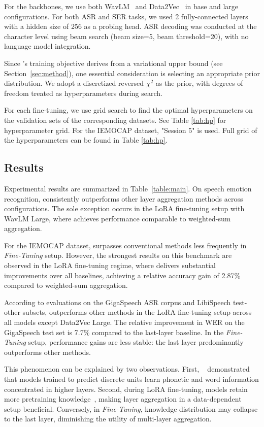 For the backbones, we use both WavLM~\cite{chen2022wavlm} and Data2Vec~\cite{baevski2022data2vec} in base and large configurations. For both ASR and SER tasks, we used 2 fully-connected layers with a hidden size of 256 as a probing head. ASR decoding was conducted at the character level using beam search (beam size=5, beam threshold=20), with no language model integration.

Since \varan’s training objective derives from a variational upper bound (see Section~\ref{sec:method}), one essential consideration is selecting an appropriate prior distribution. We adopt a discretized reversed $\chi^2$ as the prior, with degrees of freedom treated as hyperparameters during search.

For each fine-tuning, we use grid search to find the optimal hyperparameters on the validation sets of the corresponding datasets. See Table \ref{tab:hp} for hyperparameter grid. For the IEMOCAP dataset, "Session 5" is used. Full grid of the hyperparameters can be found in Table \ref{tab:hp}.

\subsection{Results}
\label{sec:4_2}

Experimental results are summarized in Table~\ref{table:main}. On speech emotion recognition, \varan consistently outperforms other layer aggregation methods across configurations. The sole exception occurs in the LoRA fine-tuning setup with WavLM Large, where \varan achieves performance comparable to weighted-sum aggregation.

For the IEMOCAP dataset, \varan surpasses conventional methods less frequently in \textit{Fine-Tuning} setup. However, the strongest results on this benchmark are observed in the LoRA fine-tuning regime, where \varan delivers substantial improvements over all baselines, achieving a relative accuracy gain of 2.87\% compared to weighted-sum aggregation. 

According to evaluations on the GigaSpeech ASR corpus and LibiSpeech test-other subsets, \varan outperforms other methods in the LoRA fine-tuning setup across all models except Data2Vec Large. The relative improvement in WER on the GigaSpeech test set is 7.7\% compared to the last-layer baseline. In the \textit{Fine-Tuning} setup, performance gains are less stable: the last layer predominantly outperforms other methods.

This phenomenon can be explained by two observations. First, ~\cite{toyota23} demonstrated that models trained to predict discrete units learn phonetic and word information concentrated in higher layers. Second, during LoRA fine-tuning, models retain more pretraining knowledge~\cite{zaiem2024less}, making layer aggregation in a data-dependent setup beneficial. Conversely, in \textit{Fine-Tuning}, knowledge distribution may collapse to the last layer, diminishing the utility of multi-layer aggregation.

